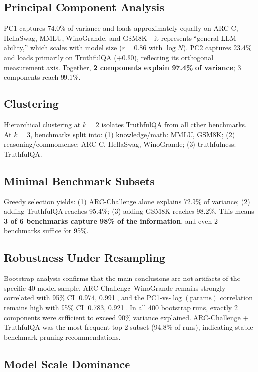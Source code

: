 \documentclass[11pt,a4paper]{article}
\begin{document}
\subsection{Principal Component Analysis}

PC1 captures 74.0\% of variance and loads approximately equally on ARC-C, HellaSwag, MMLU, WinoGrande, and GSM8K---it represents ``general LLM ability,'' which scales with model size ($r = 0.86$ with $\log N$). PC2 captures 23.4\% and loads primarily on TruthfulQA ($+0.80$), reflecting its orthogonal measurement axis. Together, \textbf{2 components explain 97.4\% of variance}; 3 components reach 99.1\%.

\subsection{Clustering}

Hierarchical clustering at $k=2$ isolates TruthfulQA from all other benchmarks. At $k=3$, benchmarks split into: (1) knowledge/math: MMLU, GSM8K; (2) reasoning/commonsense: ARC-C, HellaSwag, WinoGrande; (3) truthfulness: TruthfulQA.

\subsection{Minimal Benchmark Subsets}

Greedy selection yields: (1) ARC-Challenge alone explains 72.9\% of variance; (2) adding TruthfulQA reaches 95.4\%; (3) adding GSM8K reaches 98.2\%. This means \textbf{3 of 6 benchmarks capture 98\% of the information}, and even 2 benchmarks suffice for 95\%.

\subsection{Robustness Under Resampling}

Bootstrap analysis confirms that the main conclusions are not artifacts of the specific 40-model sample. ARC-Challenge--WinoGrande remains strongly correlated with 95\% CI [0.974, 0.991], and the PC1-vs-$\log(\text{params})$ correlation remains high with 95\% CI [0.783, 0.921]. In all 400 bootstrap runs, exactly 2 components were sufficient to exceed 90\% variance explained. ARC-Challenge + TruthfulQA was the most frequent top-2 subset (94.8\% of runs), indicating stable benchmark-pruning recommendations.

\subsection{Model Scale Dominance}
\end{document}
